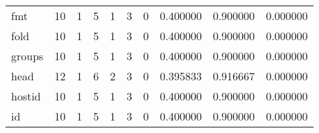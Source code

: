 \begin{longtable}{lrrrrrrrrr}
fmt       &                                       10 &                                                  1 &                                                  5 &                                                  1 &                                                  3 &                                                  0 &                                           0.400000 &                               0.900000 &                             0.000000 \\
fold      &                                       10 &                                                  1 &                                                  5 &                                                  1 &                                                  3 &                                                  0 &                                           0.400000 &                               0.900000 &                             0.000000 \\
groups    &                                       10 &                                                  1 &                                                  5 &                                                  1 &                                                  3 &                                                  0 &                                           0.400000 &                               0.900000 &                             0.000000 \\
head      &                                       12 &                                                  1 &                                                  6 &                                                  2 &                                                  3 &                                                  0 &                                           0.395833 &                               0.916667 &                             0.000000 \\
hostid    &                                       10 &                                                  1 &                                                  5 &                                                  1 &                                                  3 &                                                  0 &                                           0.400000 &                               0.900000 &                             0.000000 \\
id        &                                       10 &                                                  1 &                                                  5 &                                                  1 &                                                  3 &                                                  0 &                                           0.400000 &                               0.900000 &                             0.000000 \\

\end{longtable}
